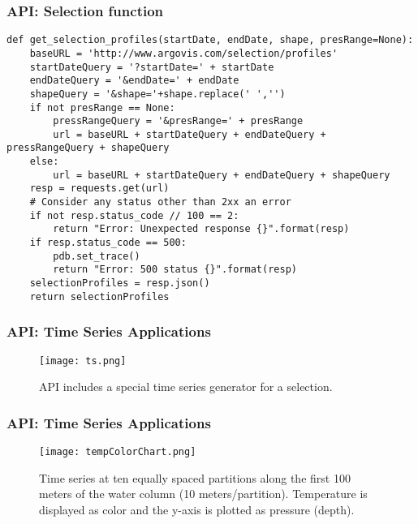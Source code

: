 \begin{frame}[fragile]
\frametitle{API: Selection function}
\begin{lstlisting}[basicstyle=\tiny, caption=Python function to retrieve selection data]
def get_selection_profiles(startDate, endDate, shape, presRange=None):
    baseURL = 'http://www.argovis.com/selection/profiles'
    startDateQuery = '?startDate=' + startDate
    endDateQuery = '&endDate=' + endDate
    shapeQuery = '&shape='+shape.replace(' ','')
    if not presRange == None:
        pressRangeQuery = '&presRange=' + presRange
        url = baseURL + startDateQuery + endDateQuery + pressRangeQuery + shapeQuery
    else:
        url = baseURL + startDateQuery + endDateQuery + shapeQuery
    resp = requests.get(url)
    # Consider any status other than 2xx an error
    if not resp.status_code // 100 == 2:
        return "Error: Unexpected response {}".format(resp)
    if resp.status_code == 500:
        pdb.set_trace()
        return "Error: 500 status {}".format(resp)
    selectionProfiles = resp.json()
    return selectionProfiles
\end{lstlisting}
\end{frame}


\begin{frame}
\frametitle{API: Time Series Applications}
\begin{figure}
\centering
\begin{minipage}{.8\columnwidth}
\texttt{[image: ts.png]}
\caption{API includes a special time series generator for a selection.}
\end{minipage}
\end{figure}
\end{frame}

\begin{frame}
\frametitle{API: Time Series Applications}
\begin{figure}
\centering
\begin{minipage}{.65\columnwidth}
\texttt{[image: tempColorChart.png]}
\caption{Time series at ten equally spaced partitions along the first 100 meters of the water column (10 meters/partition). Temperature is displayed as color and the y-axis is plotted as pressure (depth).}
\end{minipage}
\end{figure}
\end{frame}

